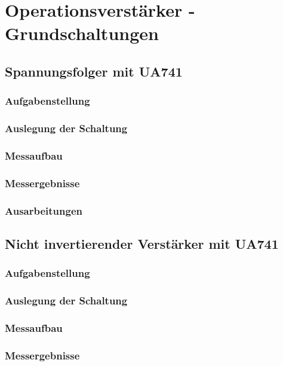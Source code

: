 \chapter{Operationsverstärker - Grundschaltungen}
	\section{Spannungsfolger mit UA741 }
		\subsection{Aufgabenstellung}

		\subsection{Auslegung der Schaltung}

		\subsection{Messaufbau}

		\subsection{Messergebnisse}

		\subsection{Ausarbeitungen}
		
	\section{Nicht invertierender Verstärker mit UA741}
		\subsection{Aufgabenstellung}

		\subsection{Auslegung der Schaltung}

		\subsection{Messaufbau}

		\subsection{Messergebnisse}

